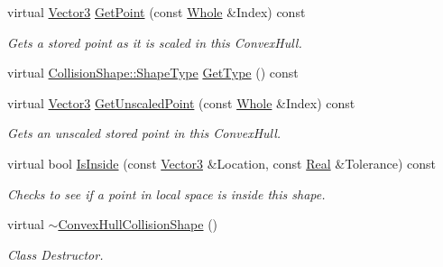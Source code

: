 \begin{DoxyCompactItemize}
virtual \hyperlink{classMezzanine_1_1Vector3}{Vector3} \hyperlink{classMezzanine_1_1ConvexHullCollisionShape_a7f769cdc76fb7c62060a28472277466d}{GetPoint} (const \hyperlink{namespaceMezzanine_adcbb6ce6d1eb4379d109e51171e2e493}{Whole} \&Index) const 
\begin{DoxyCompactList}\small\item\em Gets a stored point as it is scaled in this ConvexHull. \item\end{DoxyCompactList}\item 
virtual \hyperlink{classMezzanine_1_1CollisionShape_ad04186055565998879b64176d6dd100d}{CollisionShape::ShapeType} \hyperlink{classMezzanine_1_1ConvexHullCollisionShape_a73ccd6364f52a68a642a0fb55159f020}{GetType} () const 
\item 
virtual \hyperlink{classMezzanine_1_1Vector3}{Vector3} \hyperlink{classMezzanine_1_1ConvexHullCollisionShape_a28e1633a760562ceb8427c08232518d7}{GetUnscaledPoint} (const \hyperlink{namespaceMezzanine_adcbb6ce6d1eb4379d109e51171e2e493}{Whole} \&Index) const 
\begin{DoxyCompactList}\small\item\em Gets an unscaled stored point in this ConvexHull. \item\end{DoxyCompactList}\item 
virtual bool \hyperlink{classMezzanine_1_1ConvexHullCollisionShape_a6aa3c6afad74091dec9c933eef257301}{IsInside} (const \hyperlink{classMezzanine_1_1Vector3}{Vector3} \&Location, const \hyperlink{namespaceMezzanine_a726731b1a7df72bf3583e4a97282c6f6}{Real} \&Tolerance) const 
\begin{DoxyCompactList}\small\item\em Checks to see if a point in local space is inside this shape. \item\end{DoxyCompactList}\item 
\hypertarget{classMezzanine_1_1ConvexHullCollisionShape_ae6c30c38604747a2d2500b25d88de50e}{
virtual \hyperlink{classMezzanine_1_1ConvexHullCollisionShape_ae6c30c38604747a2d2500b25d88de50e}{$\sim$ConvexHullCollisionShape} ()}
\label{classMezzanine_1_1ConvexHullCollisionShape_ae6c30c38604747a2d2500b25d88de50e}

\begin{DoxyCompactList}\small\item\em Class Destructor. \item\end{DoxyCompactList}\end{DoxyCompactItemize}


